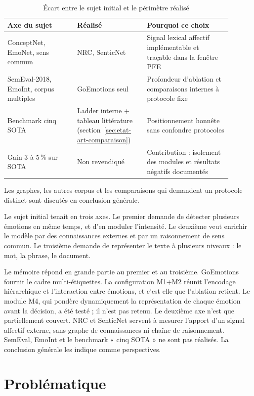 \begin{table}[H]
\centering
\caption{Écart entre le sujet initial et le périmètre réalisé}
\label{tab:evolution-sujet}
\small
\begin{tabular}{|p{0.28\linewidth}|p{0.28\linewidth}|p{0.34\linewidth}|}
\hline
\textbf{Axe du sujet} & \textbf{Réalisé} & \textbf{Pourquoi ce choix} \\
\hline
ConceptNet, EmoNet, sens commun & NRC, SenticNet & Signal lexical affectif
implémentable et traçable dans la fenêtre PFE \\
\hline
SemEval-2018, EmoInt, corpus multiples & GoEmotions seul & Profondeur
d'ablation et comparaisons internes à protocole fixe \\
\hline
Benchmark cinq SOTA & Ladder interne + tableau
littérature (section~\ref{sec:etat-art-comparaison}) & Positionnement
honnête sans confondre protocoles \\
\hline
Gain 3 à 5\,\% sur SOTA & Non revendiqué & Contribution : isolement des
modules et résultats négatifs documentés \\
\hline
\end{tabular}
\end{table}

Les graphes, les autres corpus et les comparaisons qui demandent un
protocole distinct sont discutés en conclusion générale.

Le sujet initial tenait
en trois axes. Le premier demande de détecter plusieurs émotions en même
temps, et d'en moduler l'intensité. Le deuxième veut enrichir le modèle
par des connaissances externes et par un raisonnement de sens commun. Le
troisième demande de représenter le texte à plusieurs niveaux : le mot,
la phrase, le document.

Le mémoire répond en grande partie au premier et au troisième. GoEmotions
fournit le cadre multi-étiquettes. La configuration M1+M2 réunit
l'encodage hiérarchique et l'interaction entre émotions, et c'est elle
que l'ablation retient. Le module M4, qui pondère dynamiquement la
représentation de chaque émotion avant la décision, a été testé ; il
n'est pas retenu. Le deuxième axe n'est que partiellement couvert.
NRC et SenticNet servent à mesurer l'apport d'un signal affectif
externe, sans graphe de connaissances ni chaîne de raisonnement. SemEval, EmoInt et le benchmark « cinq SOTA » ne sont
pas réalisés. La conclusion générale les indique comme perspectives.

\section{Problématique}
\label{sec:problematique}

